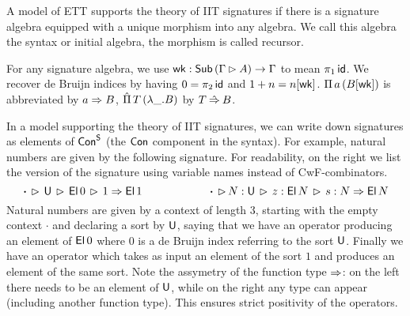 \documentclass[a4paper,UKenglish,cleveref, autoref]{lipics-v2019}
\begin{document}
\begin{definition}\label{def:theoryofsignatures}
  A model of ETT supports the theory of IIT signatures if there is a
  signature algebra equipped with a unique morphism into any
  algebra. We call this algebra the syntax or initial algebra, the
  morphism is called recursor.
\end{definition}
\begin{definition}[Abbreviations]\label{def:abbrevs}
  For any signature algebra, we use
  $\mathsf{wk} : \mathsf{Sub}\,(\Gamma\rhd A)\rightarrow \Gamma$ to mean $\pi_1\,\mathsf{id}$. We
  recover de Bruijn indices by having $0= \pi_2 \,\mathsf{id}$ and
  $1+n = n[\mathsf{wk}]$. $\Pi\,a\,(B[\mathsf{wk}])$ is abbreviated by $a\Rightarrow B$,
  $\hat{\Pi}\,T\,(\lambda\_.B)$ by $T\mathbin{\hat{\Rightarrow}} B$.
\end{definition}

In a model supporting the theory of IIT signatures, we can write down
signatures as elements of $\mathsf{Con}^{\mathsf{S}}$ (the $\mathsf{Con}$ component in the
syntax). For example, natural numbers are given by the following
signature. For readability, on the right we list the version of the
signature using variable names instead of CwF-combinators.
\[
\boldsymbol{\cdot}\,\rhd\,\mathsf{U}\,\rhd\,\mathsf{El}\,0\,\rhd\,1 \Rightarrow \mathsf{El}\,1 \hspace{5.9em}
\boldsymbol{\cdot}\,\rhd\,N:\mathsf{U}\,\rhd\,z : \mathsf{El}\,N\,\rhd\,s : N \Rightarrow \mathsf{El}\,N
\]
Natural numbers are given by a context of length 3, starting with the
empty context $\boldsymbol{\cdot}$ and declaring a sort by $\mathsf{U}$,
saying that we have an operator producing an element of $\mathsf{El}\,0$ where
$0$ is a de Bruijn index referring to the sort $\mathsf{U}$. Finally we have
an operator which takes as input an element of the sort $1$ and
produces an element of the same sort. Note the assymetry of the
function type $\Rightarrow$: on the left there needs to be an element of $\mathsf{U}$,
while on the right any type can appear (including another function
type). This ensures strict positivity of the operators.
\end{document}
